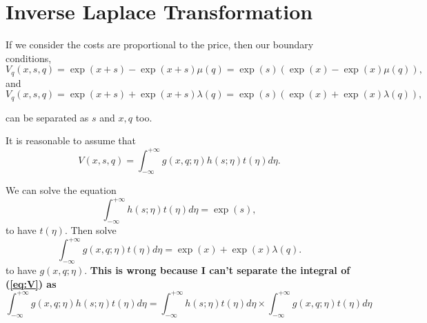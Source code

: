 \documentclass[paper=a4, fontsize=15pt]{scrartcl} %
\numberwithin{equation}{section} %
\numberwithin{figure}{section} %
\numberwithin{table}{section} %
\begin{document}

\section{Inverse Laplace Transformation}
If we consider the costs are proportional to the price, then our boundary conditions,
\begin{equation*}
  V_q(x,s,q) = \exp(x +s) - \exp(x+s) \mu(q) = \exp(s)\left(\exp(x) - \exp(x) \mu(q)\right),
\end{equation*}
and 
\begin{equation*}
  V_q(x,s,q) = \exp(x +s) + \exp(x+s) \lambda(q) = \exp(s)\left(\exp(x) + \exp(x)\lambda(q)\right),
\end{equation*}

can be separated as $s$ and $x,q$ too.

It is reasonable to assume that
\begin{equation}\label{eq:V}
  V(x,s,q) = \int_{-\infty}^{+\infty}g(x,q;\eta)h(s;\eta)t(\eta)d\eta.
\end{equation}

We can solve the equation
\begin{equation*}
  \int_{-\infty}^{+\infty}h(s;\eta)t(\eta)d\eta = \exp(s),
\end{equation*}
to have $t(\eta)$. Then solve
\begin{equation*}
  \int_{-\infty}^{+\infty}g(x,q;\eta)t(\eta)d\eta = \exp(x) + \exp(x)\lambda(q).
\end{equation*}
to have $g(x,q;\eta)$. {\bf This is wrong because I can't separate the integral of (\ref{eq:V}) as}
\begin{equation*}
  \int_{-\infty}^{+\infty}g(x,q;\eta)h(s;\eta)t(\eta)d\eta = \int_{-\infty}^{+\infty}h(s;\eta)t(\eta)d\eta \times \int_{-\infty}^{+\infty}g(x,q;\eta)t(\eta)d\eta
\end{equation*}
\end{document}
